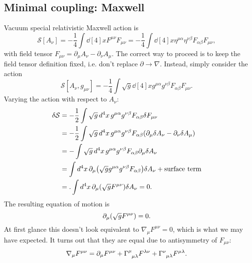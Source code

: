 \documentclass{article}
\begin{document}
\subsection{Minimal coupling: Maxwell}
Vacuum special relativistic Maxwell action is
\begin{equation}
	\mathcal{S}[A_{\nu}] = -\frac{1}{4} \int \dd[4]{x}  F^{\mu \nu} F_{\mu \nu} = -\frac{1}{4} \int \dd[4]{x}  \eta^{\mu \alpha} \eta^{\nu \beta} F_{\alpha \beta} F_{\mu \nu},
\end{equation}
with field tensor $ F_{\mu \nu} = \partial_{\mu}A_{\nu} - \partial_{\nu} A_{\mu} $. The correct way to proceed is to keep the field tensor definition fixed, i.e. don't replace $ \partial \to \nabla $. Instead, simply consider the action
\begin{equation}
	\mathcal{S}[A_{\nu}, g_{\mu \nu}] = -\frac{1}{4} \int \sqrt{g}\dd[4]{x}  g^{\mu \alpha} g^{\nu \beta} F_{\alpha \beta} F_{\mu \nu}. 
\end{equation}
Varying the action with respect to $ A_{\nu} $:
\begin{align}
	\begin{split}
		\delta \mathcal{S} &= -\frac{1}{2} \int \sqrt{g}\dd[4]{x}  g^{\mu \alpha} g^{\nu \beta} F_{\alpha \beta} \delta F_{\mu \nu} \\
		&= -\frac{1}{2} \int \sqrt{g}\dd[4]{x}  g^{\mu \alpha} g^{\nu \beta} F_{\alpha \beta} (\partial_{\mu} \delta A_{\nu} - \partial_{\nu} \delta A_{\mu}) \\
		&= -\int \sqrt{g}\dd[4]{x}  g^{\mu \alpha} g^{\nu \beta} F_{\alpha \beta} \partial_{\mu} \delta A_{\nu} \\
		&= \int \dd[4]{x} \partial_{\mu} \qty(\sqrt{g} g^{\mu \alpha} g^{\nu \beta} F_{\alpha \beta}) \delta A_{\nu} + \text{surface term} \\
		&= .\int \dd[4]{x} \partial_{\mu} \qty(\sqrt{g} F^{\mu \nu}) \delta A_{\nu} = 0.
	\end{split}
\end{align}
The resulting equation of motion is
\begin{equation}
	\partial_{\mu} \qty(\sqrt{g} F^{\mu \nu}) = 0.
\end{equation}
At first glance this doesn't look equivalent to $ \nabla_{\mu} F^{\mu \nu} = 0 $, which is what we may have expected. It turns out that they are equal due to antisymmetry of $ F_{\mu \nu} $:
\begin{equation}
	\nabla_{\mu} F^{\mu \nu} = \partial_{\mu} F^{\mu \nu} + \Gamma\indices{^{\mu}_{\mu \lambda}} F^{\lambda \nu} + \Gamma\indices{^{\nu}_{\mu \lambda}} F^{\mu \lambda}.
\end{equation}
\end{document}
